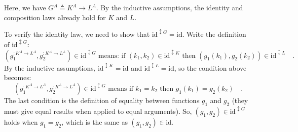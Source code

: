 Here, we have $G^{A}\triangleq K^{A}\rightarrow L^{A}$. By the inductive
assumptions, the identity and composition laws already hold for $K$
and $L$.

To verify the identity law, we need to show that $\text{id}^{\updownarrow G}=\text{id}$.
Write the definition of $\text{id}^{\updownarrow G}$:
\[
(g_{1}^{:K^{A}\rightarrow L^{A}},g_{2}^{:K^{A}\rightarrow L^{A}})\in\text{id}^{\updownarrow G}\text{ means: if }(k_{1},k_{2})\in\text{id}^{\updownarrow K}\text{ then }(g_{1}(k_{1}),g_{2}(k_{2}))\in\text{id}^{\updownarrow L}\quad.
\]
By the inductive assumptions, $\text{id}^{\updownarrow K}=\text{id}$
and $\text{id}^{\updownarrow L}=\text{id}$, so the condition above
becomes:
\[
(g_{1}^{:K^{A}\rightarrow L^{A}},g_{2}^{:K^{A}\rightarrow L^{A}})\in\text{id}^{\updownarrow G}\text{ means if }k_{1}=k_{2}\text{ then }g_{1}(k_{1})=g_{2}(k_{2})\quad.
\]
The last condition is the definition of equality between functions
$g_{1}$ and $g_{2}$ (they must give equal results when applied to
equal arguments). So, $(g_{1},g_{2})\in\text{id}^{\updownarrow G}$
holds when $g_{1}=g_{2}$, which is the same as $(g_{1},g_{2})\in\text{id}$.

